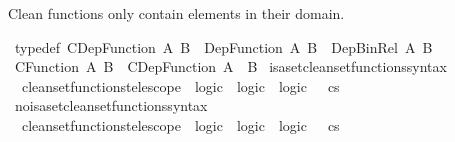 \begin{isabellebody}
%
\isadelimproof
%
\endisadelimproof
%
\begin{isamarkuptext}%
Clean functions only contain elements in their domain.%
\end{isamarkuptext}\isamarkuptrue%
\isamarkupfalse%
\ {\isacharbrackleft}{\kern0pt}typedef{\isacharbrackright}{\kern0pt}{\isacharcolon}{\kern0pt}\ {\isachardoublequoteopen}CDep{\isacharunderscore}{\kern0pt}Function\ A\ B\ {\isasymequiv}\ Dep{\isacharunderscore}{\kern0pt}Function\ A\ B\ {\isacharampersand}{\kern0pt}\ Dep{\isacharunderscore}{\kern0pt}Bin{\isacharunderscore}{\kern0pt}Rel\ A\ B{\isachardoublequoteclose}\isanewline
\isanewline
{}\isamarkupfalse%
\ {\isachardoublequoteopen}CFunction\ A\ B\ {\isasymequiv}\ CDep{\isacharunderscore}{\kern0pt}Function\ A\ {\isacharparenleft}{\kern0pt}{\isasymlambda}{\isacharunderscore}{\kern0pt}{\isachardot}{\kern0pt}\ B{\isacharparenright}{\kern0pt}{\isachardoublequoteclose}\isanewline
\isanewline
{}\isamarkupfalse%
\ isa{\isacharunderscore}{\kern0pt}set{\isacharunderscore}{\kern0pt}clean{\isacharunderscore}{\kern0pt}set{\isacharunderscore}{\kern0pt}functions{\isacharunderscore}{\kern0pt}syntax\isanewline
{}\isanewline
{}\isamarkupfalse%
\isanewline
\ \ {\isachardoublequoteopen}{\isacharunderscore}{\kern0pt}clean{\isacharunderscore}{\kern0pt}set{\isacharunderscore}{\kern0pt}functions{\isacharunderscore}{\kern0pt}telescope{\isachardoublequoteclose}\ {\isacharcolon}{\kern0pt}{\isacharcolon}{\kern0pt}\ {\isachardoublequoteopen}logic\ {\isasymRightarrow}\ logic\ {\isasymRightarrow}\ logic{\isachardoublequoteclose}\ \ {\isacharparenleft}{\kern0pt}\ {\isachardoublequoteopen}{\isasymrightarrow}cs{\isachardoublequoteclose}\ {}{}{\isacharparenright}{\kern0pt}\isanewline
{}\isamarkupfalse%
\isanewline
{}\isamarkupfalse%
\ no{\isacharunderscore}{\kern0pt}isa{\isacharunderscore}{\kern0pt}set{\isacharunderscore}{\kern0pt}clean{\isacharunderscore}{\kern0pt}set{\isacharunderscore}{\kern0pt}functions{\isacharunderscore}{\kern0pt}syntax\isanewline
{}\isanewline
{}\isamarkupfalse%
\isanewline
\ \ {\isachardoublequoteopen}{\isacharunderscore}{\kern0pt}clean{\isacharunderscore}{\kern0pt}set{\isacharunderscore}{\kern0pt}functions{\isacharunderscore}{\kern0pt}telescope{\isachardoublequoteclose}\ {\isacharcolon}{\kern0pt}{\isacharcolon}{\kern0pt}\ {\isachardoublequoteopen}logic\ {\isasymRightarrow}\ logic\ {\isasymRightarrow}\ logic{\isachardoublequoteclose}\ \ {\isacharparenleft}{\kern0pt}\ {\isachardoublequoteopen}{\isasymrightarrow}cs{\isachardoublequoteclose}\ {}{}{\isacharparenright}{\kern0pt}\isanewline

\end{isabellebody}
